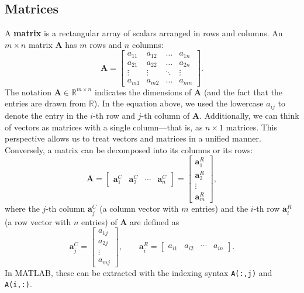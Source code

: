 \subsection{Matrices}
A \textbf{matrix} is a rectangular array of scalars arranged in rows and columns. An $ m \times n $ matrix $ \mathbf{A} $ has $ m $ rows and $ n $ columns:
\begin{equation*}
    \mathbf{A} = \begin{bmatrix} 
        a_{11} & a_{12} & \ldots & a_{1n} \\ 
        a_{21} & a_{22} & \ldots & a_{2n} \\ 
        \vdots & \vdots & \ddots & \vdots \\ 
        a_{m1} & a_{m2} & \ldots & a_{mn} 
    \end{bmatrix}.
\end{equation*}
The notation $ \mathbf{A} \in \mathbb{R}^{m \times n} $ indicates the dimensions of $ \mathbf{A} $ (and the fact that the entries are drawn from $\mathbb{R}$).
In the equation above, we used the lowercase $ a_{ij} $ to denote the entry in the $ i $-th row and $ j $-th column of $ \mathbf{A} $.
Additionally, we can think of vectors as matrices with a single column---that is, as $ n \times 1 $ matrices.
This perspective allows us to treat vectors and matrices in a unified manner.
Conversely, a matrix can be decomposed into its columns or its rows:
\begin{equation*}
    \mathbf{A} =
    \begin{bmatrix} \mathbf{a}^C_1 & \mathbf{a}^C_2 & \cdots & \mathbf{a}^C_n \end{bmatrix}
    =
    \begin{bmatrix} \mathbf{a}^R_1 \\ \mathbf{a}^R_2 \\ \vdots \\ \mathbf{a}^R_m \end{bmatrix},
\end{equation*}
where the $ j $-th column $ \mathbf{a}^C_j $ (a column vector with $ m $ entries) and the $ i $-th row $ \mathbf{a}^R_i $ (a row vector with $ n $ entries) of $ \mathbf{A} $ are defined as
\begin{equation*}
    \mathbf{a}^C_j = \begin{bmatrix} a_{1j} \\ a_{2j} \\ \vdots \\ a_{mj} \end{bmatrix},
    \qquad
    \mathbf{a}^R_i = \begin{bmatrix} a_{i1} & a_{i2} & \cdots & a_{in} \end{bmatrix}.
\end{equation*}
In MATLAB, these can be extracted with the indexing syntax \texttt{A(:,j)} and \texttt{A(i,:)}.

